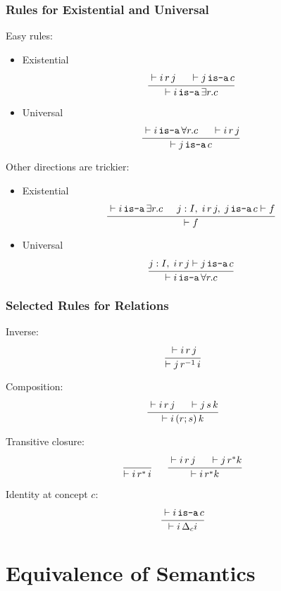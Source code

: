 \begin{frame}\frametitle{Rules for Existential and Universal}
Easy rules:
\begin{itemize}
\item Existential
\[\cfrac{\vdash i\,r\,j \hspace*{.5cm} \vdash j\mathop{\texttt{is-a}} c}{\vdash i \mathop{\texttt{is-a}} \exists r.c }\,\]
\item Universal
\[\cfrac{\vdash i \mathop{\texttt{is-a}} \forall r.c \hspace*{.5cm} \vdash i\,r\,j}{\vdash j\mathop{\texttt{is-a}} c}\,\]
\end{itemize}

Other directions are trickier:

\begin{itemize}
\item Existential
\[\cfrac{\vdash i \mathop{\texttt{is-a}} \exists r.c \hspace*{.5cm} j:I,\;i\,r\,j,\;j\mathop{\texttt{is-a}} c\vdash f}{\vdash f}\,\]
\item Universal
\[\cfrac{j:I,\; i\,r\,j\vdash j\mathop{\texttt{is-a}} c}{\vdash i\mathop{\texttt{is-a}}\forall r.c}\,\]
\end{itemize}
\end{frame}

\begin{frame}\frametitle{Selected Rules for Relations}
Inverse:
\[\cfrac{\vdash i \,r\,j}{\vdash j\,r^{-1}\,i}\,\]

Composition:
\[\cfrac{\vdash i \,r\,j \hspace*{.5cm} \vdash j\,s\,k}{\vdash i\,(r;s)\,k}\,\]

Transitive closure:
\[\cfrac{}{\vdash i \,r^*\,i}\, \hspace*{.5cm} \cfrac{\vdash i\,r\,j \hspace*{.5cm} \vdash j\,r^* k}{\vdash i\,r^* k}\,\]

Identity at concept $c$:
\[\cfrac{\vdash i \mathop{\texttt{is-a}} c}{\vdash i\,\Delta_c i}\,\]
\end{frame}

\section{Equivalence of Semantics}


